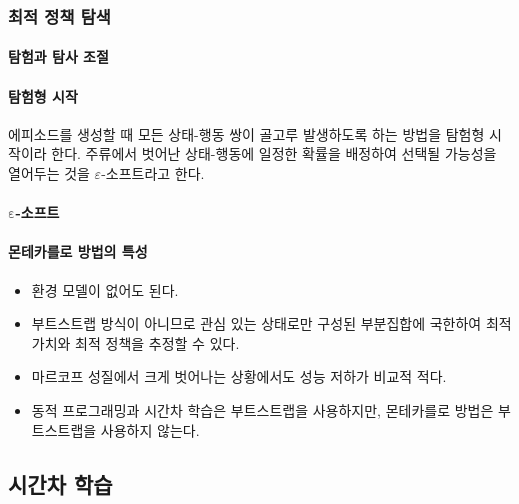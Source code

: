 \documentclass [12pt] {oblivoir}
\let\oldsubsubsection=\subsubsection
\renewcommand{\subsubsection}
{
  \filbreak
  \oldsubsubsection
}
\begin{document}
\vspace{3mm}

\subsubsection{최적 정책 탐색}

\paragraph*{탐험과 탐사 조절}\mbox{}

\vspace{3mm}

\paragraph*{탐험형 시작}\mbox{}

에피소드를 생성할 때 모든 상태-행동 쌍이 골고루 발생하도록 하는 방법을 탐험형 시작이라 한다.
주류에서 벗어난 상태-행동에 일정한 확률을 배정하여 선택될 가능성을 열어두는 것을 $\varepsilon$-소프트라고 한다.

\vspace{3mm}

\paragraph*{$\mathbf{\mathrm{\varepsilon}}$-소프트}\mbox{}

\vspace{3mm}

\paragraph*{몬테카를로 방법의 특성}\mbox{}
\begin{itemize}
  \item 환경 모델이 없어도 된다.
  \item 부트스트랩 방식이 아니므로 관심 있는 상태로만 구성된 부분집합에 국한하여 최적 가치와 최적 정책을 추정할 수 있다.
  \item 마르코프 성질에서 크게 벗어나는 상황에서도 성능 저하가 비교적 적다.
  \item 동적 프로그래밍과 시간차 학습은 부트스트랩을 사용하지만, 몬테카를로 방법은 부트스트랩을 사용하지 않는다.
\end{itemize}

\vspace{3mm}

\subsection{시간차 학습}
\end{document}
